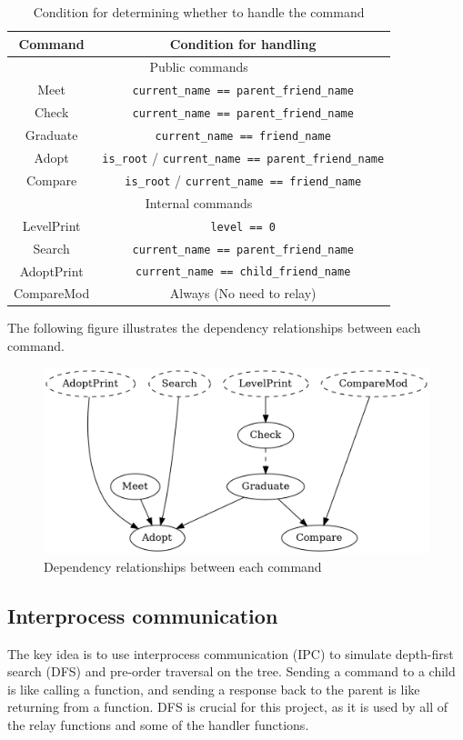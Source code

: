 \documentclass[12pt, a4paper]{article}
\begin{document}
  \begin{table}[H]
    \centering
    \caption{Condition for determining whether to handle the command}
    \begin{tabular}{|c|c|}
      \hline
      \textbf{Command} & \textbf{Condition for handling} \\\hline
      \multicolumn{2}{|c|}{Public commands} \\\hline
      Meet & \verb|current_name == parent_friend_name| \\\hline
      Check & \verb|current_name == parent_friend_name| \\\hline
      Graduate & \verb|current_name == friend_name| \\\hline
      Adopt & \verb|is_root| / \verb|current_name == parent_friend_name| \\\hline
      Compare & \verb|is_root| / \verb|current_name == friend_name| \\\hline
      \multicolumn{2}{|c|}{Internal commands} \\\hline
      LevelPrint & \verb|level == 0| \\\hline
      Search & \verb|current_name == parent_friend_name| \\\hline
      AdoptPrint & \verb|current_name == child_friend_name| \\\hline
      CompareMod & Always (No need to relay) \\\hline
    \end{tabular}
  \end{table}

  The following figure illustrates the dependency relationships between each command.\nopagebreak
  \begin{figure}[H]
    \centering
    \includegraphics[width=0.7\linewidth]{command_dependency.png}
    \caption{Dependency relationships between each command}
  \end{figure}

  \subsection{Interprocess communication}
  The key idea is to use interprocess communication (IPC) to simulate depth-first search (DFS)
  and pre-order traversal on the tree. Sending a command to a child is like calling
  a function, and sending a response back to the parent is like returning from a function.
  DFS is crucial for this project, as it is used by all of the relay functions
  and some of the handler functions.
\end{document}
